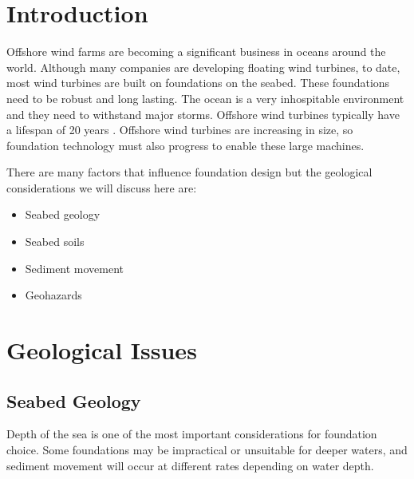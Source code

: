 \documentclass[12pt]{article} %
\newlength{\wideitemsep}
\let\olditem\item
\renewcommand{\item}{\setlength{\itemsep}{\wideitemsep}\olditem}
\begin{document}




\section{Introduction} %
Offshore wind farms are becoming a significant business in oceans around the world.
Although many companies are developing floating wind turbines, to date, most wind turbines are built on foundations on the seabed.
These foundations need to be robust and long lasting. The ocean is a very inhospitable environment and they need to withstand major storms. Offshore wind turbines typically have a lifespan of 20 years \cite{Siemens:1}. Offshore wind turbines are increasing in size, so foundation technology must also progress to enable these large machines.

There are many factors that influence foundation design but the geological considerations we will discuss here are:
  \begin{itemize}
    \item Seabed geology
    \item Seabed soils
    \item Sediment movement
    \item Geohazards
  \end{itemize}


\section{Geological Issues}


\subsection{Seabed Geology}
Depth of the sea is one of the most important considerations for foundation choice. Some foundations may be impractical or unsuitable for deeper waters, and sediment movement will occur at different rates depending on water depth.
\end{document}
